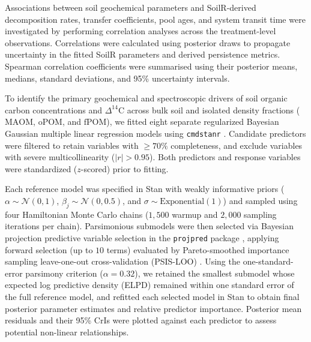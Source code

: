 \documentclass[preprint,12pt]{elsarticle}
\begin{document}
Associations between soil geochemical parameters and SoilR-derived decomposition rates, transfer coefficients, pool ages, and system transit time were investigated by performing correlation analyses across the treatment-level observations. Correlations were calculated using posterior draws to propagate uncertainty in the fitted SoilR parameters and derived persistence metrics. Spearman correlation coefficients were summarised using their posterior means, medians, standard deviations, and 95\% uncertainty intervals. 

To identify the primary geochemical and spectroscopic drivers of soil organic carbon concentrations and $\Delta^{14}\text{C}$ across bulk soil and isolated density fractions ($\text{MAOM}$, $\text{oPOM}$, and $\text{fPOM}$), we fitted eight separate regularized Bayesian Gaussian multiple linear regression models using \texttt{cmdstanr} \citep{Carpenter2017, Gabry2025}. Candidate predictors were filtered to retain variables with $\ge 70\%$ completeness, and exclude variables with severe multicollinearity ($|r| > 0.95$). Both predictors and response variables were standardized ($z$-scored) prior to fitting.

Each reference model was specified in Stan with weakly informative priors ($\alpha \sim \mathcal{N}(0, 1)$, $\beta_j \sim \mathcal{N}(0, 0.5)$, and $\sigma \sim \text{Exponential}(1)$) and sampled using four Hamiltonian Monte Carlo chains ($1{,}500$ warmup and $2{,}000$ sampling iterations per chain). Parsimonious submodels were then selected via Bayesian projection predictive variable selection in the \texttt{projpred} package \citep{Piironen2020, Catalina2022}, applying forward selection (up to $10$ terms) evaluated by Pareto-smoothed importance sampling leave-one-out cross-validation (PSIS-LOO) \citep{Vehtari2017}. Using the one-standard-error parsimony criterion ($\alpha = 0.32$), we retained the smallest submodel whose expected log predictive density (ELPD) remained within one standard error of the full reference model, and refitted each selected model in Stan to obtain final posterior parameter estimates and relative predictor importance. Posterior mean residuals and their 95\% CrIs were plotted against each predictor to assess potential non-linear relationships.
\end{document}

